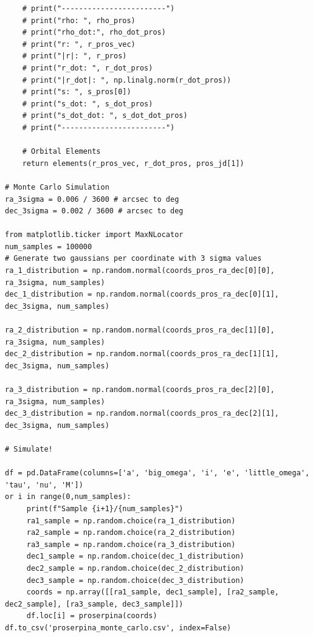 \documentclass{article}
\begin{document}
\begin{appendices}
\begin{tiny}
\begin{verbatim}
    # print("------------------------")
    # print("rho: ", rho_pros)
    # print("rho_dot:", rho_dot_pros)
    # print("r: ", r_pros_vec)
    # print("|r|: ", r_pros)
    # print("r_dot: ", r_dot_pros)
    # print("|r_dot|: ", np.linalg.norm(r_dot_pros))
    # print("s: ", s_pros[0])
    # print("s_dot: ", s_dot_pros)
    # print("s_dot_dot: ", s_dot_dot_pros)
    # print("------------------------")
    
    # Orbital Elements
    return elements(r_pros_vec, r_dot_pros, pros_jd[1])

# Monte Carlo Simulation
ra_3sigma = 0.006 / 3600 # arcsec to deg
dec_3sigma = 0.002 / 3600 # arcsec to deg

from matplotlib.ticker import MaxNLocator
num_samples = 100000
# Generate two gaussians per coordinate with 3 sigma values
ra_1_distribution = np.random.normal(coords_pros_ra_dec[0][0], ra_3sigma, num_samples)
dec_1_distribution = np.random.normal(coords_pros_ra_dec[0][1], dec_3sigma, num_samples)

ra_2_distribution = np.random.normal(coords_pros_ra_dec[1][0], ra_3sigma, num_samples)
dec_2_distribution = np.random.normal(coords_pros_ra_dec[1][1], dec_3sigma, num_samples)

ra_3_distribution = np.random.normal(coords_pros_ra_dec[2][0], ra_3sigma, num_samples)
dec_3_distribution = np.random.normal(coords_pros_ra_dec[2][1], dec_3sigma, num_samples)

# Simulate!

df = pd.DataFrame(columns=['a', 'big_omega', 'i', 'e', 'little_omega', 'tau', 'nu', 'M'])
or i in range(0,num_samples):
     print(f"Sample {i+1}/{num_samples}")
     ra1_sample = np.random.choice(ra_1_distribution)
     ra2_sample = np.random.choice(ra_2_distribution)
     ra3_sample = np.random.choice(ra_3_distribution)
     dec1_sample = np.random.choice(dec_1_distribution)
     dec2_sample = np.random.choice(dec_2_distribution)
     dec3_sample = np.random.choice(dec_3_distribution)
     coords = np.array([[ra1_sample, dec1_sample], [ra2_sample, dec2_sample], [ra3_sample, dec3_sample]])
     df.loc[i] = proserpina(coords)
df.to_csv('proserpina_monte_carlo.csv', index=False)
\end{verbatim}
\end{tiny}


\end{appendices}
\end{document}
